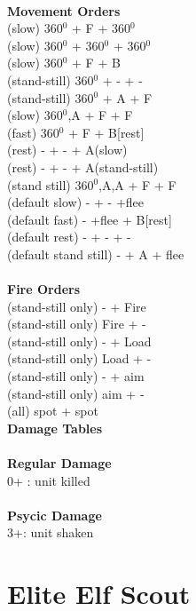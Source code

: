 \ \\ {\bf Movement Orders } \\
(slow) 360$^0$ + F + 360$^0$ \\
(slow) 360$^0$ + 360$^0$ + 360$^0$ \\
(slow) 360$^0$ + F + B  \\
(stand-still) 360$^0$ + - + - \\
(stand-still) 360$^0$ + A + F \\
(slow) 360$^0$,A + F + F \\
(fast) 360$^0$ + F + B[rest] \\
(rest) - + - + A(slow) \\
(rest) - + - + A(stand-still) \\
(stand still) 360$^0$,A,A + F + F \\
(default slow) - + - +flee \\
(default fast) - +flee + B[rest] \\
(default rest) - + - + - \\
(default stand still) - + A + flee \\
\ \\ {\bf Fire Orders } \\
(stand-still only) - + Fire \\
(stand-still only) Fire + -  \\
(stand-still only) - + Load \\
(stand-still only) Load + - \\
(stand-still only) - + aim \\
(stand-still only) aim + -  \\
(all) spot + spot \\



{\bf Damage Tables} \\
\ \\ {\bf Regular Damage } \\
0+ : unit killed \\
\ \\ {\bf Psycic Damage } \\
3+: unit shaken \\









\pagebreak

\section{ Elite Elf Scout }

